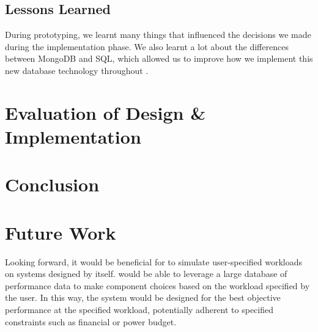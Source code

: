 \documentclass[11pt]{article}
\begin{document}
	\subsection{Lessons Learned}
		During prototyping, we learnt many things that influenced the decisions we made during the implementation phase.
		We also learnt a lot about the differences between MongoDB and SQL, which allowed us to improve how we implement this new database technology throughout \opendc{}.

\newpage

\section{Evaluation of Design \& Implementation} \label{sec:evaluation}



\newpage

\section{Conclusion} \label{sec:conclusion}

\section{Future Work} \label{sec:future-work}
	Looking forward, it would be beneficial for \opendc{} to simulate user-specified workloads on systems designed by \opendc{} itself. 
	\opendc{} would be able to leverage a large database of performance data to make component choices based on the workload specified by the user. 
	In this way, the system would be designed for the best objective performance at the specified workload, potentially adherent to specified constraints such as financial or power budget.


\newpage


\end{document}

